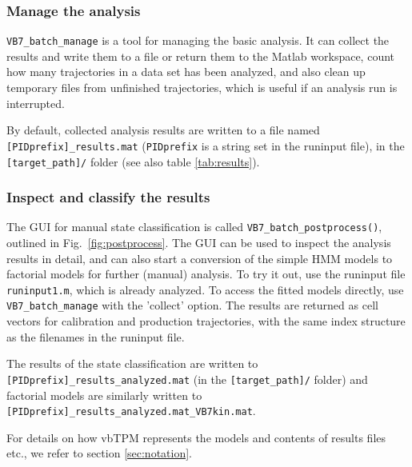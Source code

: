\subsubsection*{Manage the analysis}
\verb+VB7_batch_manage+ is a tool for managing the basic analysis. It
can collect the results and write them to a file or return them to the
Matlab workspace, count how many trajectories in a data set has been
analyzed, and also clean up temporary files from unfinished
trajectories, which is useful if an analysis run is interrupted.

By default, collected analysis results are written to a file named
\texttt{[PIDprefix]\_results.mat} (\texttt{PIDprefix} is a string set
in the runinput file), in the \texttt{[target\_path]/} folder (see
also table \ref{tab:results}).

\subsubsection*{Inspect and classify the results} 
The GUI for manual state classification is called
\verb+VB7_batch_postprocess()+, outlined in
Fig.~\ref{fig:postprocess}. The GUI can be used to inspect the
analysis results in detail, and can also start a conversion of the
simple HMM models to factorial models for further (manual)
analysis. To try it out, use the runinput file \verb+runinput1.m+,
which is already analyzed. To access the fitted models directly, use
\verb+VB7_batch_manage+ with the 'collect' option. The results are
returned as cell vectors for calibration and production trajectories,
with the same index structure as the filenames in the runinput file.

The results of the state classification are written to
\texttt{[PIDprefix]\_results\_analyzed.mat} (in the
\texttt{[target\_path]/} folder) and factorial models are similarly
written to \texttt{[PIDprefix]\_results\_analyzed.mat\_VB7kin.mat}.

For details on how vbTPM represents the models and contents of results
files etc., we refer to section \ref{sec:notation}.


